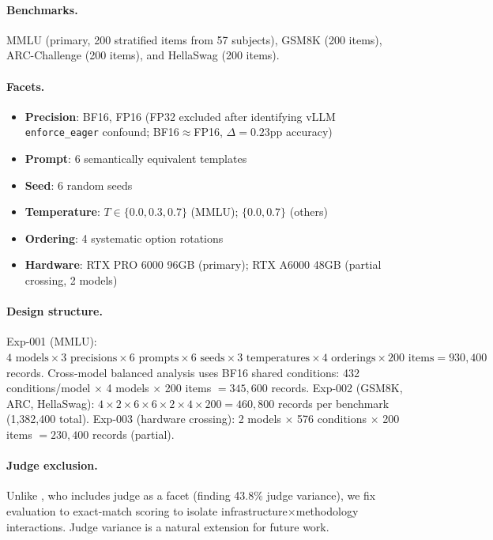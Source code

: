 \documentclass[letterpaper]{article}
\begin{document}
\paragraph{Benchmarks.}
MMLU (primary, 200 stratified items from 57 subjects), GSM8K (200 items), ARC-Challenge (200 items), and HellaSwag (200 items).

\paragraph{Facets.}
\begin{itemize}
  \item \textbf{Precision}: BF16, FP16 (FP32 excluded after identifying vLLM \texttt{enforce\_eager} confound; BF16$\approx$FP16, $\Delta=0.23$pp accuracy)
  \item \textbf{Prompt}: 6 semantically equivalent templates
  \item \textbf{Seed}: 6 random seeds
  \item \textbf{Temperature}: $T \in \{0.0, 0.3, 0.7\}$ (MMLU); $\{0.0, 0.7\}$ (others)
  \item \textbf{Ordering}: 4 systematic option rotations
  \item \textbf{Hardware}: RTX PRO 6000 96GB (primary); RTX A6000 48GB (partial crossing, 2 models)
\end{itemize}

\paragraph{Design structure.}
Exp-001 (MMLU): $4 \text{ models} \times 3 \text{ precisions} \times 6 \text{ prompts} \times 6 \text{ seeds} \times 3 \text{ temperatures} \times 4 \text{ orderings} \times 200 \text{ items} = 930{,}400$ records.
Cross-model balanced analysis uses BF16 shared conditions: 432 conditions/model $\times$ 4 models $\times$ 200 items $= 345{,}600$ records.
Exp-002 (GSM8K, ARC, HellaSwag): $4 \times 2 \times 6 \times 6 \times 2 \times 4 \times 200 = 460{,}800$ records per benchmark (1,382,400 total).
Exp-003 (hardware crossing): 2 models $\times$ 576 conditions $\times$ 200 items $= 230{,}400$ records (partial).

\paragraph{Judge exclusion.}
Unlike \citet{mesting2026generalizability}, who includes judge as a facet (finding 43.8\% judge variance), we fix evaluation to exact-match scoring to isolate infrastructure$\times$methodology interactions.
Judge variance is a natural extension for future work.
\end{document}
